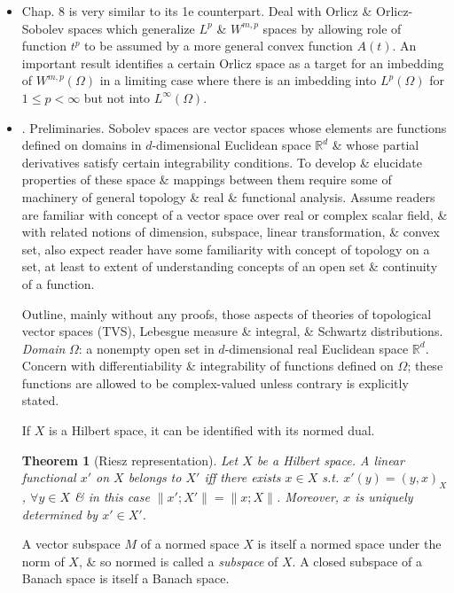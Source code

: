 \documentclass{article}
\newtheorem{theorem}{Theorem}
\begin{document}
\begin{enumerate}
\begin{itemize}
		\item Chap. 8 is very similar to its 1e counterpart. Deal with Orlicz \& Orlicz-Sobolev spaces which generalize $L^p$ \& $W^{m,p}$ spaces by allowing role of function $t^p$ to be assumed by a more general convex function $A(t)$. An important result identifies a certain Orlicz space as a target for an imbedding of $W^{m,p}(\Omega)$ in a limiting case where there is an imbedding into $L^p(\Omega)$ for $1\le p < \infty$ but not into $L^\infty(\Omega)$.
	\end{itemize}
	
	\begin{itemize}
		\item {. Preliminaries.} Sobolev spaces are vector spaces whose elements are functions defined on domains in $d$-dimensional Euclidean space $\mathbb{R}^d$ \& whose partial derivatives satisfy certain integrability conditions. To develop \& elucidate properties of these space \& mappings between them require some of machinery of general topology \& real \& functional analysis. Assume readers are familiar with concept of a vector space over real or complex scalar field, \& with related notions of dimension, subspace, linear transformation, \& convex set, also expect reader have some familiarity with concept of topology on a set, at least to extent of understanding concepts of an open set \& continuity of a function.
		
		Outline, mainly without any proofs, those aspects of theories of topological vector spaces (TVS), Lebesgue measure \& integral, \& Schwartz distributions. {\it Domain} $\Omega$: a nonempty open set in $d$-dimensional real Euclidean space $\mathbb{R}^d$. Concern with differentiability \& integrability of functions defined on $\Omega$; these functions are allowed to be complex-valued unless contrary is explicitly stated.
		
		If $X$ is a Hilbert space, it can be identified with its normed dual.
		\begin{theorem}[Riesz representation]
			Let $X$ be a Hilbert space. A linear functional $x'$ on $X$ belongs to $X'$ iff there exists $x\in X$ s.t. $x'(y) = (y,x)_X$, $\forall y\in X$ \& in this case $\|x';X'\| = \|x;X\|$. Moreover, $x$ is uniquely determined by $x'\in X'$.
		\end{theorem}
		A vector subspace $M$ of a normed space $X$ is itself a normed space under the norm of $X$, \& so normed is called a {\it subspace} of $X$. A closed subspace of a Banach space is itself a Banach space.
		

\end{itemize}
\end{enumerate}
\end{document}
